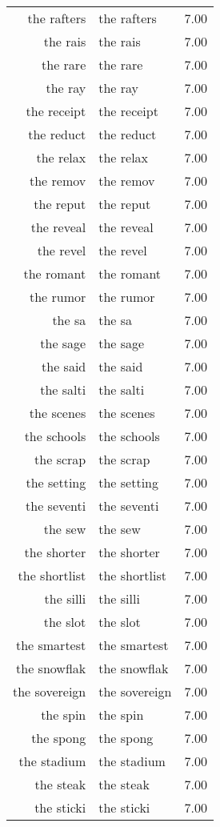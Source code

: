 \begin{table}[ht]
\begin{tabular}{rlr}
  the rafters & the rafters & 7.00 \\ 
  the rais & the rais & 7.00 \\ 
  the rare & the rare & 7.00 \\ 
  the ray & the ray & 7.00 \\ 
  the receipt & the receipt & 7.00 \\ 
  the reduct & the reduct & 7.00 \\ 
  the relax & the relax & 7.00 \\ 
  the remov & the remov & 7.00 \\ 
  the reput & the reput & 7.00 \\ 
  the reveal & the reveal & 7.00 \\ 
  the revel & the revel & 7.00 \\ 
  the romant & the romant & 7.00 \\ 
  the rumor & the rumor & 7.00 \\ 
  the sa & the sa & 7.00 \\ 
  the sage & the sage & 7.00 \\ 
  the said & the said & 7.00 \\ 
  the salti & the salti & 7.00 \\ 
  the scenes & the scenes & 7.00 \\ 
  the schools & the schools & 7.00 \\ 
  the scrap & the scrap & 7.00 \\ 
  the setting & the setting & 7.00 \\ 
  the seventi & the seventi & 7.00 \\ 
  the sew & the sew & 7.00 \\ 
  the shorter & the shorter & 7.00 \\ 
  the shortlist & the shortlist & 7.00 \\ 
  the silli & the silli & 7.00 \\ 
  the slot & the slot & 7.00 \\ 
  the smartest & the smartest & 7.00 \\ 
  the snowflak & the snowflak & 7.00 \\ 
  the sovereign & the sovereign & 7.00 \\ 
  the spin & the spin & 7.00 \\ 
  the spong & the spong & 7.00 \\ 
  the stadium & the stadium & 7.00 \\ 
  the steak & the steak & 7.00 \\ 
  the sticki & the sticki & 7.00 \\ 

\end{tabular}
\end{table}
